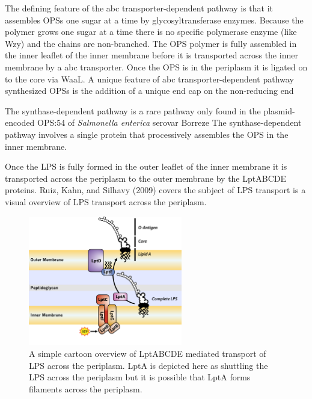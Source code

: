 The defining feature of the \ac{abc} transporter-dependent pathway is that it
assembles \acp{OPS} one sugar at a time by glycosyltransferase enzymes. Because the polymer grows one sugar at a time there is no
specific polymerase enzyme (like Wzy) and the chains are non-branched. The \ac{OPS} polymer is fully assembled in the inner leaflet of the inner membrane before it is transported
across the inner membrane by a \ac{abc} transporter. Once the \ac{OPS} is in the periplasm it is ligated on to the core via WaaL. A unique feature of \ac{abc} transporter-dependent
pathway synthesized \acp{OPS} is the addition of a unique end cap on the non-reducing end

The synthase-dependent pathway is a rare pathway only found in the plasmid-encoded \ac{OPS}:54 of \textit{Salmonella enterica} serovar Borreze The
synthase-dependent pathway involves a single protein that processively assembles the \ac{OPS} in the inner membrane.

Once the \ac{LPS} is fully formed in the outer leaflet of the inner membrane it is transported across the periplasm to the outer membrane by the LptABCDE proteins. Ruiz, Kahn, and
Silhavy (2009) covers the subject of \ac{LPS} transport  is a visual overview of \ac{LPS} transport across the periplasm.
 
\begin{figure}[htb]
  	\begin{center}
   		\includegraphics[width=0.6\textwidth]{intro/img/lpstransport.pdf}
   	\end{center}
   	\caption[A simple overview of \ac{LPS} transport across the periplasm]{ A simple cartoon overview of LptABCDE mediated transport of \ac{LPS} across the periplasm. LptA is
depicted here as shuttling the \ac{LPS} across the periplasm but it is possible that LptA forms filaments across the periplasm.}
\label{fig:lpstransport}
\end{figure} %
